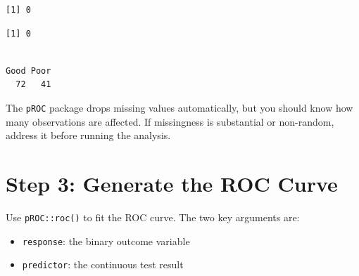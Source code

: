 \documentclass[
  letterpaper,
  DIV=11,
  numbers=noendperiod]{scrreprt}
\newenvironment{Shaded}{\begin{snugshade}}{\end{snugshade}}
\newcommand{\CommentTok}[1]{\textcolor[rgb]{0.37,0.37,0.37}{#1}}
\newcommand{\FunctionTok}[1]{\textcolor[rgb]{0.28,0.35,0.67}{#1}}
\newcommand{\NormalTok}[1]{\textcolor[rgb]{0.00,0.23,0.31}{#1}}
\newcommand{\SpecialCharTok}[1]{\textcolor[rgb]{0.37,0.37,0.37}{#1}}
\providecommand{\tightlist}{%
  \setlength{\itemsep}{0pt}\setlength{\parskip}{0pt}}\usepackage{longtable,booktabs,array}
\begin{document}
\begin{Shaded}
\end{Shaded}

\begin{verbatim}
[1] 0
\end{verbatim}

\begin{Shaded}
\end{Shaded}

\begin{verbatim}
[1] 0
\end{verbatim}

\begin{Shaded}
\end{Shaded}

\begin{verbatim}

Good Poor 
  72   41 
\end{verbatim}

The \texttt{pROC} package drops missing values automatically, but you
should know how many observations are affected. If missingness is
substantial or non-random, address it before running the analysis.

\section{Step 3: Generate the ROC
Curve}\label{step-3-generate-the-roc-curve}

Use \texttt{pROC::roc()} to fit the ROC curve. The two key arguments
are:

\begin{itemize}
\tightlist
\item
  \texttt{response}: the binary outcome variable
\item
  \texttt{predictor}: the continuous test result
\end{itemize}
\end{document}
